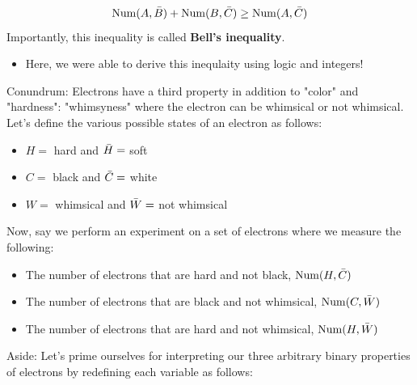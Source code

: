 \documentclass[a4paper]{article}
\begin{document}
\begin{equation}
    \mathrm{Num}(A,\Bar{B}) + \mathrm{Num}(B,\Bar{C}) \geq \mathrm{Num}(A,\Bar{C})
\end{equation}
Importantly, this inequality is called \textbf{Bell's inequality}.
\begin{itemize}
    \item Here, we were able to derive this inequlaity using logic and integers! 
\end{itemize}
Conundrum: Electrons have a third property in addition to "color" and "hardness": "whimsyness" where the electron can be whimsical or not whimsical. Let's define the various possible states of an electron as follows:
\begin{itemize}
    \item $H=$ hard and $\Bar{H}=$ soft
    \item $C=$ black and $\Bar{C}=$ white
    \item $W=$ whimsical and $\Bar{W}=$ not whimsical
\end{itemize}
Now, say we perform an experiment on a set of electrons where we measure the following: 
\begin{itemize}
    \item The number of electrons that are hard and not black, $\mathrm{Num}(H,\Bar{C})$
    \item The number of electrons that are black and not whimsical, $\mathrm{Num}(C,\Bar{W})$
    \item The number of electrons that are hard and not whimsical, $\mathrm{Num}(H,\Bar{W})$
\end{itemize}
Aside: Let's prime ourselves for interpreting our three arbitrary binary properties of electrons by redefining each variable as follows: 
\end{document}
